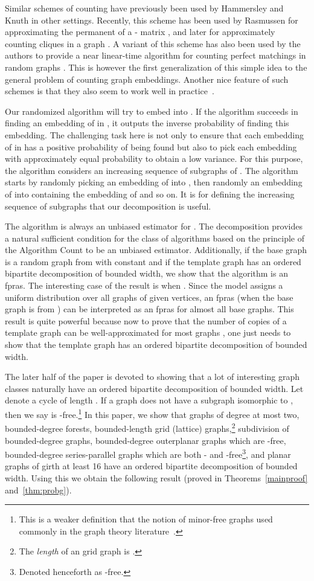 \documentclass[11pt]{article}
\begin{document}
Similar schemes of counting have  previously been used by Hammersley \cite{hammer} and Knuth \cite{knuth} in other settings. Recently, this scheme has been used by Rasmussen for approximating the permanent of a - matrix \cite{ras}, and later for approximately counting cliques in a graph \cite{ras1}. A variant of this scheme has also been used by the authors to provide a near linear-time algorithm for counting perfect matchings in random graphs \cite{shiva,shiva1}. This is however the first generalization of this simple idea to the general problem of counting graph embeddings. Another nice feature  of such schemes is that they also seem to work well in practice~\cite{piotr}.

Our randomized algorithm will try to embed  into . If the algorithm succeeds in finding an embedding of  in , it outputs the inverse probability of finding this embedding. The challenging task here is not only to ensure that each embedding of  in  has a positive probability of being found but also to pick each embedding with approximately equal probability to obtain a low variance. For this purpose, the algorithm considers an increasing sequence of subgraphs  of . The algorithm starts by randomly picking an embedding of  into , then randomly an embedding of  into  containing the embedding of  and so on. It is for defining the increasing sequence of subgraphs that our decomposition is useful. 

The algorithm is always an unbiased estimator for .  The decomposition provides a natural sufficient condition for the class of algorithms based on the principle of the Algorithm Count to be an unbiased estimator. Additionally, if the base graph is a random graph from  with constant  and if the template graph has an ordered bipartite decomposition of bounded width, we show that the algorithm is an fpras.  The interesting case of the result is when . Since the  model assigns a uniform distribution over all graphs of  given vertices, an fpras (when the base graph is from ) can be interpreted as an fpras for almost all base graphs. This result is quite powerful because now to prove that the number of copies of a template graph can be well-approximated for most graphs , one just needs to show that the template graph has an ordered bipartite decomposition of bounded width.

The later half of the paper is devoted to showing that a lot of interesting graph classes naturally have an ordered bipartite decomposition of bounded width.  Let  denote a cycle of length .  If a graph  does not have a subgraph isomorphic to , then we say  is -free.\!\footnote{This is a weaker definition that the notion of minor-free graphs used commonly in the graph theory literature~\cite{diestel}.} In this paper, we show that graphs of degree at most two, bounded-degree forests, bounded-length grid (lattice) graphs,\!\footnote{The {\em length} of an  grid graph is .} subdivision of bounded-degree graphs, bounded-degree outerplanar graphs which are -free, bounded-degree series-parallel graphs which are both - and -free\footnote{Denoted henceforth as -free.}, and planar graphs of girth at least 16 have an ordered bipartite decomposition of bounded width. Using this we obtain the following result (proved in Theorems~\ref{mainproof} and~\ref{thm:probg}). 
\end{document}
